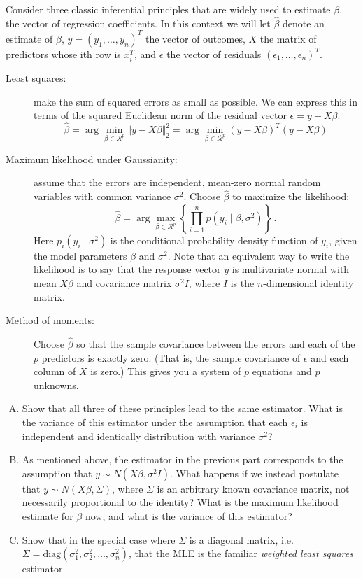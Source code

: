 \documentclass{mynotes}
\begin{document}
Consider three classic inferential principles that are widely used to estimate $\beta$, the vector of regression coefficients.  In this context we will let $\hat{\beta}$ denote an estimate of $\beta$, $y = (y_1, \ldots, y_n)^T$ the vector of outcomes, $X$ the matrix of predictors whose ith row is $x_i^T$, and $\epsilon$ the vector of residuals $(\epsilon_1, \ldots, \epsilon_n)^T$.  
 
\begin{description}
\item[Least squares:] make the sum of squared errors as small as possible.  We can express this in terms of the squared Euclidean norm of the residual vector $\epsilon = y - X \beta$:  
$$
\hat{\beta} = \arg \min_{\beta \in \mathcal{R}^p} \Vert y - X\beta \Vert_2^2 =  \arg \min_{\beta \in \mathcal{R}^p} (y - X\beta)^T (y-X \beta)
$$
\item[Maximum likelihood under Gaussianity:] assume that the errors are independent, mean-zero normal random variables with common variance $\sigma^2$.  Choose $\hat{\beta}$ to maximize the likelihood:
$$
\hat{\beta} = \arg \max_{\beta \in \mathcal{R}^p} \left\{ \prod_{i=1}^n p(y_i \mid \beta, \sigma^2) \right\} \, .
$$
Here $p_i(y_i \mid \sigma^2)$ is the conditional probability density function of $y_i$, given the model parameters $\beta$ and $\sigma^2$.  Note that an equivalent way to write the likelihood is to say that the response vector $y$ is multivariate normal with mean $X \beta$ and covariance matrix $\sigma^2 I$, where $I$ is the $n$-dimensional identity matrix.  

\item[Method of moments:] Choose $\hat{\beta}$ so that the sample covariance between the errors and each of the $p$ predictors is exactly zero.  (That is, the sample covariance of $\epsilon$ and each column of $X$ is zero.)  This gives you a system of $p$ equations and $p$ unknowns.
\end{description}

\begin{enumerate}[(A)]

\item Show that all three of these principles lead to the same estimator.  What is the variance of this estimator under the assumption that each $\epsilon_i$ is independent and identically distribution with variance $\sigma^2$?  

\item As mentioned above, the estimator in the previous part corresponds to the assumption that $y \sim N(X \beta, \sigma^2 I)$.  What happens if we instead postulate that $y \sim N(X \beta, \Sigma)$, where $\Sigma$ is an arbitrary known covariance matrix, not necessarily proportional to the identity?  What is the maximum likelihood estimate for $\beta$ now, and what is the variance of this estimator?   

\item Show that in the special case where $\Sigma$ is a diagonal matrix, i.e. $\Sigma = \mbox{diag}(\sigma_1^2, \sigma_2^2, \ldots, \sigma_n^2)$, that the MLE is the familiar \emph{weighted least squares} estimator.  


\end{enumerate}
\end{document}
